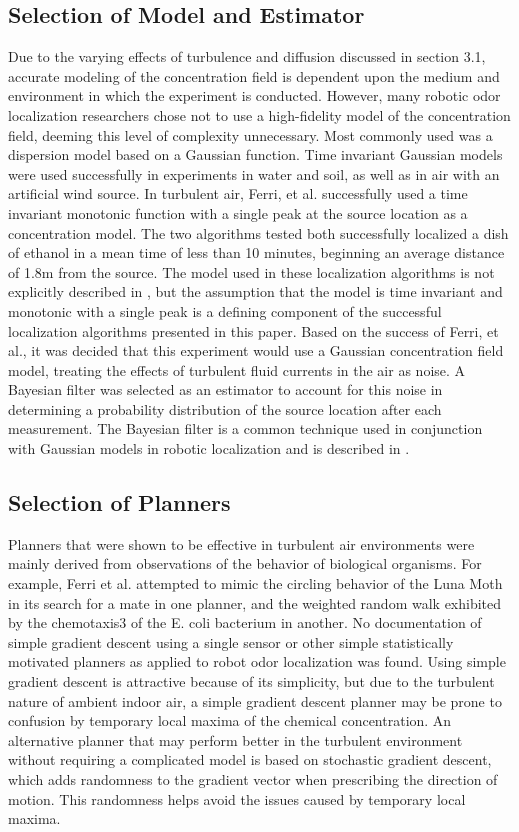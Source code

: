 \documentclass[submit]{aiaa-pretty-modified}
\begin{document}
\subsection{Selection of Model and Estimator}
Due to the varying effects of turbulence and diffusion discussed in section 3.1,
accurate modeling of the concentration field is dependent upon the medium and
environment in which the experiment is conducted. However, many robotic odor
localization researchers chose not to use a high-fidelity model of the
concentration field, deeming this level of complexity unnecessary. \cite{kowadlo} Most
commonly used was a dispersion model based on a Gaussian function. Time
invariant Gaussian models were used successfully in experiments in water and
soil, as well as in air with an artificial wind source. \cite{kowadlo} In turbulent air,
Ferri, et al. successfully used a time invariant monotonic function with a
single peak at the source location as a concentration model. \cite{ferri} The two
algorithms tested both successfully localized a dish of ethanol in a mean time
of less than 10 minutes, beginning an average distance of 1.8m from the source.
The model used in these localization algorithms is not explicitly described in
\cite{ferri}, but the assumption that the model is time invariant and monotonic with a
single peak is a defining component of the successful localization algorithms
presented in this paper. Based on the success of Ferri, et al., it was decided
that this experiment would use a Gaussian concentration field model, treating
the effects of turbulent fluid currents in the air as noise. A Bayesian filter
was selected as an estimator to account for this noise in determining a
probability distribution of the source location after each measurement. The
Bayesian filter is a common technique used in conjunction with Gaussian models
in robotic localization and is described in \cite{bergman}.

\subsection{Selection of Planners}
Planners that were shown to be effective in turbulent air environments were
mainly derived from observations of the behavior of biological organisms.
\cite{ferri} For example, Ferri et al. attempted to mimic the circling behavior
of the Luna Moth in its search for a mate in one planner, and the weighted
random walk exhibited by the chemotaxis3 of the E. coli bacterium in another.
\cite{ferri} No documentation of simple gradient descent using a single sensor
or other simple statistically motivated planners as applied to robot odor
localization was found. Using simple gradient descent is attractive because of
its simplicity, but due to the turbulent nature of ambient indoor air, a simple
gradient descent planner may be prone to confusion by temporary local maxima of
the chemical concentration. An alternative planner that may perform better in
the turbulent environment without requiring a complicated model is based on
stochastic gradient descent, which adds randomness to the gradient vector when
prescribing the direction of motion. \cite{bottou} This randomness helps avoid
the issues caused by temporary local maxima.
\end{document}
